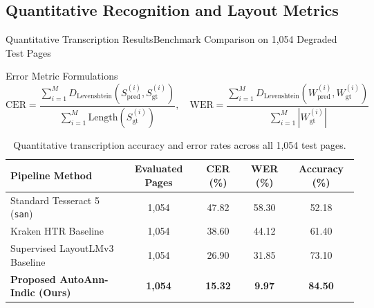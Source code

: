 \documentclass[
  aspectratio=169,
]{beamer}
\begin{document}
\subsection{Quantitative Recognition and Layout Metrics}

\begin{frame}{Quantitative Transcription Results}{Benchmark Comparison on 1,054 Degraded Test Pages}
\begin{block}{Error Metric Formulations}
\[
  \text{CER} = \frac{\sum_{i=1}^M D_{\text{Levenshtein}}(S_{\text{pred}}^{(i)}, S_{\text{gt}}^{(i)})}{\sum_{i=1}^M \text{Length}(S_{\text{gt}}^{(i)})}, \quad \text{WER} = \frac{\sum_{i=1}^M D_{\text{Levenshtein}}(W_{\text{pred}}^{(i)}, W_{\text{gt}}^{(i)})}{\sum_{i=1}^M |W_{\text{gt}}^{(i)}|}
\]
\end{block}
\begin{table}
  \centering
  \small
  \begin{tabular}{lcccc}
    \toprule
    \textbf{Pipeline Method} & \textbf{Evaluated Pages} & \textbf{CER (\%)} & \textbf{WER (\%)} & \textbf{Accuracy (\%)} \\
    \midrule
    Standard Tesseract 5 (\texttt{san}) & 1,054 & 47.82 & 58.30 & 52.18 \\
    Kraken HTR Baseline & 1,054 & 38.60 & 44.12 & 61.40 \\
    Supervised LayoutLMv3 Baseline & 1,054 & 26.90 & 31.85 & 73.10 \\
    \textbf{Proposed AutoAnn-Indic (Ours)} & \textbf{1,054} & \textbf{15.32} & \textbf{9.97} & \textbf{84.50} \\
    \bottomrule
  \end{tabular}
  \caption{Quantitative transcription accuracy and error rates across all 1,054 test pages.}
\end{table}
\end{frame}
\end{document}
